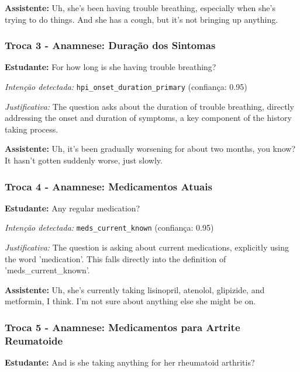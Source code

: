 \textbf{Assistente:} Uh, she's been having trouble breathing, especially when she's trying to do things. And she has a cough, but it's not bringing up anything.

\vspace{0.5cm}

\subsubsection*{Troca 3 - Anamnese: Duração dos Sintomas}

\textbf{Estudante:} For how long is she having trouble breathing?

\textit{Intenção detectada:} \texttt{hpi\_onset\_duration\_primary} (confiança: 0.95)

\textit{Justificativa:} The question asks about the duration of trouble breathing, directly addressing the onset and duration of symptoms, a key component of the history taking process.

\textbf{Assistente:} Uh, it's been gradually worsening for about two months, you know? It hasn't gotten suddenly worse, just slowly.

\vspace{0.5cm}

\subsubsection*{Troca 4 - Anamnese: Medicamentos Atuais}

\textbf{Estudante:} Any regular medication?

\textit{Intenção detectada:} \texttt{meds\_current\_known} (confiança: 0.95)

\textit{Justificativa:} The question is asking about current medications, explicitly using the word 'medication'. This falls directly into the definition of 'meds\_current\_known'.

\textbf{Assistente:} Uh, she's currently taking lisinopril, atenolol, glipizide, and metformin, I think. I'm not sure about anything else she might be on.

\vspace{0.5cm}

\subsubsection*{Troca 5 - Anamnese: Medicamentos para Artrite Reumatoide}

\textbf{Estudante:} And is she taking anything for her rheumatoid arthritis?

